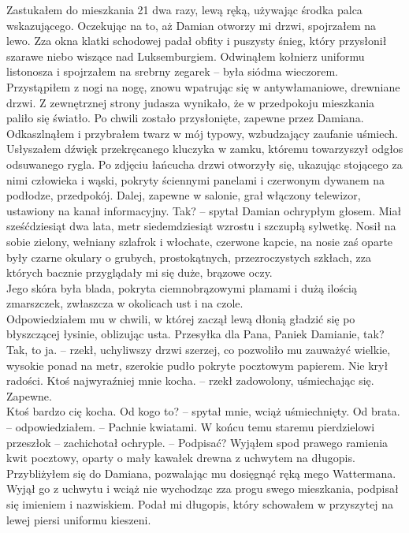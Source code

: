 \documentclass[../MAIN.tex]{subfiles}
\begin{document}
Zastukałem do mieszkania 21 dwa razy, lewą ręką, używając środka palca wskazującego. Oczekując na to, aż Damian otworzy mi drzwi, spojrzałem na lewo. Zza okna klatki schodowej padał obfity i puszysty śnieg, który przysłonił szarawe niebo wiszące nad Luksemburgiem. Odwinąłem kołnierz uniformu listonosza i spojrzałem na srebrny zegarek -- była siódma wieczorem. Przystąpiłem z nogi na nogę, znowu wpatrując się w antywłamaniowe, drewniane drzwi. Z zewnętrznej strony judasza wynikało, że w przedpokoju mieszkania paliło się światło. Po chwili zostało przysłonięte, zapewne przez Damiana.
Odkaszlnąłem i przybrałem twarz w mój typowy, wzbudzający zaufanie uśmiech. Usłyszałem dźwięk przekręcanego kluczyka w zamku, któremu towarzyszył odgłos odsuwanego rygla. Po zdjęciu łańcucha drzwi otworzyły się, ukazując stojącego za nimi człowieka i wąski, pokryty ściennymi panelami i czerwonym dywanem na podłodze, przedpokój. Dalej, zapewne w salonie, grał włączony telewizor, ustawiony na kanał informacyjny.
\sx Tak? -- spytał Damian ochrypłym głosem.
\qd
Miał sześćdziesiąt dwa lata, metr siedemdziesiąt wzrostu i szczupłą sylwetkę. Nosił na sobie zielony, wełniany szlafrok i włochate, czerwone kapcie, na nosie zaś oparte były czarne okulary o grubych, prostokątnych, przezroczystych szkłach, zza których bacznie przyglądały mi się duże, brązowe oczy.
\\
Jego skóra była blada, pokryta ciemnobrązowymi plamami i dużą ilością zmarszczek, zwłaszcza w okolicach ust i na czole.
\\
Odpowiedziałem mu w chwili, w której zaczął lewą dłonią gładzić się po błyszczącej łysinie, oblizując usta.
\sx Przesyłka dla Pana, Panie\3k Damianie, tak?
\xx Tak, to ja. -- rzekł, uchyliwszy drzwi szerzej, co pozwoliło mu zauważyć wielkie, wysokie ponad na metr, szerokie pudło pokryte pocztowym papierem. 
\qd
Nie krył radości.
\sx Ktoś najwyraźniej mnie kocha. -- rzekł zadowolony, uśmiechając się.
\qd
Zapewne.
\\
Ktoś bardzo cię kocha.
\sx Od kogo to? -- spytał mnie, wciąż uśmiechnięty.
\xx Od brata. -- odpowiedziałem. -- Pachnie kwiatami.
\xx W końcu temu staremu pierdzielowi przeszło\3k -- zachichotał ochryple. -- Podpisać?
\qd
Wyjąłem spod prawego ramienia kwit pocztowy, oparty o mały kawałek drewna z uchwytem na długopis. Przybliżyłem się do Damiana, pozwalając mu dosięgnąć ręką mego Wattermana. Wyjął go z uchwytu i wciąż nie wychodząc zza progu swego mieszkania, podpisał się imieniem i nazwiskiem. Podał mi długopis, który schowałem w przyszytej na lewej piersi uniformu kieszeni.
\\
\end{document}
